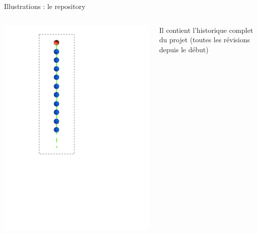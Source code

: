 \begin{frame}{%
\protect\hypertarget{illustrations-le-repository}{%
Illustrations : le repository}}

\begin{columns}[T]
\begin{column}{0.40\textwidth}
\includegraphics[height=1.5\textwidth]{images/repo.pdf}
\end{column}

\begin{column}{0.60\textwidth}
Il contient l’historique complet du projet (toutes les révisions depuis
le début)
\end{column}
\end{columns}

\end{frame}

